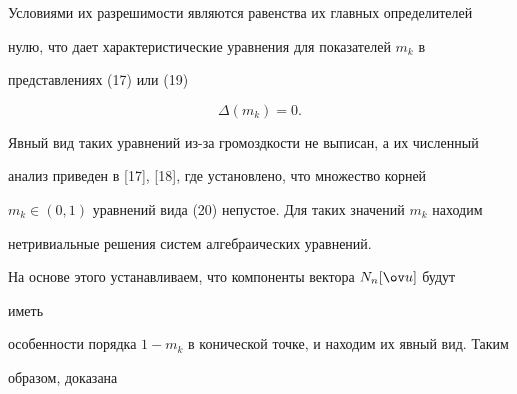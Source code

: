  


Условиями их разрешимости являются равенства их главных определителей  


нулю, что дает характеристические уравнения для показателей $m_k$ в  


представлениях (17) или (19) 


\begin{equation} 


\Delta(m_k)=0. 


\end{equation} 


Явный вид таких уравнений из-за громоздкости не выписан, а их численный  


анализ приведен в [17], [18], где установлено, что множество корней  


$m_k\in(0,1)$ уравнений вида (20) непустое. Для таких значений $m_k$ находим  


нетривиальные решения систем алгебраических уравнений.  


На основе этого устанавливаем, что компоненты вектора $N_n[\ov u]$ будут 


иметь  


особенности порядка $1-m_k$ в конической точке, и находим их явный вид. Таким  


образом, доказана 


 


 


